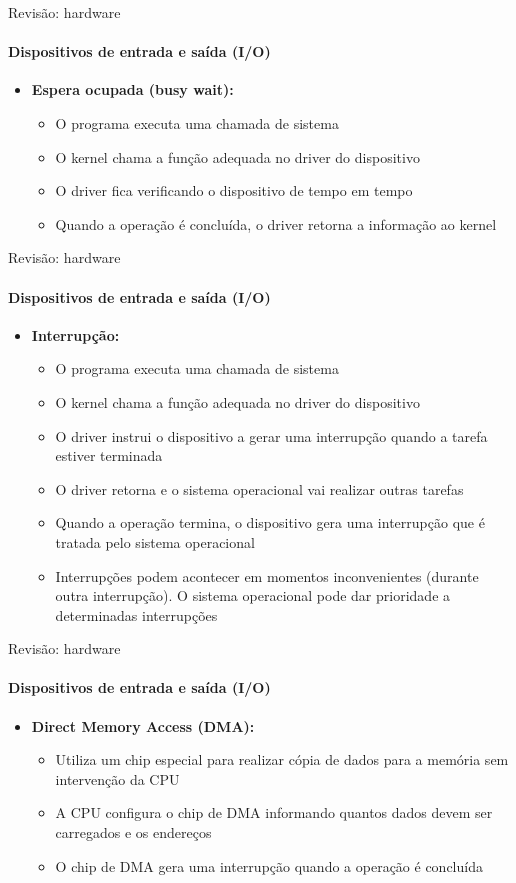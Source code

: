 \documentclass{beamer}
\begin{document}
\begin{frame}{Revisão: hardware}
	\framesubtitle{Dispositivos de entrada e saída (I/O)}
	\begin{itemize}
		\item \textbf{Espera ocupada (busy wait):}
		\begin{itemize}
			\item O programa executa uma chamada de sistema
			\item O kernel chama a função adequada no driver do dispositivo
			\item O driver fica verificando o dispositivo de tempo em tempo
			\item Quando a operação é concluída, o driver retorna a informação ao kernel
		\end{itemize}
	\end{itemize}
\end{frame}
\begin{frame}{Revisão: hardware}
	\framesubtitle{Dispositivos de entrada e saída (I/O)}
	\begin{itemize}
		\item \textbf{Interrupção:}
		\begin{itemize}
			\item O programa executa uma chamada de sistema
			\item O kernel chama a função adequada no driver do dispositivo
			\item O driver instrui o dispositivo a gerar uma \alert{interrupção} quando a tarefa estiver terminada
			\item O driver retorna e o sistema operacional vai realizar outras tarefas
			\item Quando a operação termina, o dispositivo gera uma interrupção que é tratada pelo sistema operacional
			\item Interrupções podem acontecer em momentos inconvenientes (durante outra interrupção). O sistema operacional pode dar prioridade a determinadas interrupções
		\end{itemize}
	\end{itemize}
\end{frame}
\begin{frame}{Revisão: hardware}
	\framesubtitle{Dispositivos de entrada e saída (I/O)}
	\begin{itemize}
		\item \textbf{Direct Memory Access (DMA):}
		\begin{itemize}
			\item Utiliza um chip especial para realizar cópia de dados para a memória sem intervenção da CPU
			\item A CPU configura o chip de DMA informando quantos dados devem ser carregados e os endereços
			\item O chip de DMA gera uma interrupção quando a operação é concluída
		\end{itemize}
	\end{itemize}
\end{frame}
\end{document}
